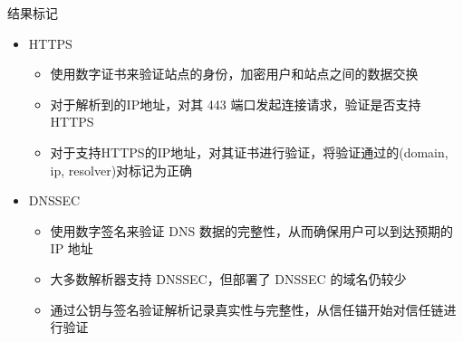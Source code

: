 \documentclass{beamer}
\begin{document}
  \begin{frame}{结果标记}
    \begin{itemize}
      \item HTTPS
      \begin{itemize}
        \item 使用数字证书来验证站点的身份，加密用户和站点之间的数据交换
        \item 对于解析到的IP地址，对其 443 端口发起连接请求，验证是否支持HTTPS
        \item 对于支持HTTPS的IP地址，对其证书进行验证，将验证通过的(domain, ip, resolver)对标记为正确
      \end{itemize}
      \item DNSSEC
      \begin{itemize}
        \item 使用数字签名来验证 DNS 数据的完整性，从而确保用户可以到达预期的 IP 地址
        \item 大多数解析器支持 DNSSEC，但部署了 DNSSEC 的域名仍较少
        \item 通过公钥与签名验证解析记录真实性与完整性，从信任锚开始对信任链进行验证
      \end{itemize}
    \end{itemize}

  \end{frame}
\end{document}
